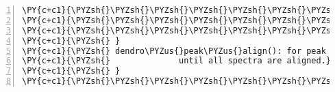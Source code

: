 \begin{Verbatim}[commandchars=\\\{\},codes={\catcode`\$=3\catcode`\^=7\catcode`\_=8},gobble=0,numbers=left,fontfamily=fvm,fontshape=n,fontsize=\footnotesize,tabsize=2]
\PY{c+c1}{\PYZsh{}\PYZsh{}\PYZsh{}\PYZsh{}\PYZsh{}\PYZsh{}\PYZsh{}\PYZsh{}\PYZsh{}\PYZsh{}\PYZsh{}\PYZsh{}\PYZsh{}\PYZsh{}\PYZsh{}\PYZsh{}\PYZsh{}\PYZsh{}\PYZsh{}\PYZsh{}\PYZsh{}\PYZsh{}\PYZsh{}\PYZsh{}\PYZsh{}\PYZsh{}\PYZsh{}\PYZsh{}\PYZsh{}\PYZsh{}\PYZsh{}\PYZsh{}\PYZsh{}\PYZsh{}\PYZsh{}\PYZsh{}\PYZsh{}\PYZsh{}\PYZsh{}\PYZsh{}\PYZsh{}\PYZsh{}\PYZsh{}\PYZsh{}\PYZsh{}\PYZsh{}\PYZsh{}\PYZsh{}\PYZsh{}\PYZsh{}\PYZsh{}\PYZsh{}\PYZsh{}\PYZsh{}\PYZsh{}\PYZsh{}\PYZsh{}\PYZsh{}\PYZsh{}\PYZsh{}\PYZsh{}\PYZsh{}\PYZsh{}\PYZsh{}\PYZsh{}\PYZsh{}\PYZsh{}\PYZsh{}\PYZsh{}\PYZsh{}\PYZsh{}\PYZsh{}\PYZsh{}\PYZsh{}\PYZsh{}\PYZsh{}\PYZsh{}\PYZsh{}\PYZsh{}}
\PY{c+c1}{\PYZsh{}\PYZsh{}\PYZsh{}\PYZsh{}\PYZsh{}\PYZsh{}\PYZsh{}\PYZsh{}\PYZsh{}\PYZsh{}\PYZsh{}\PYZsh{}\PYZsh{}\PYZsh{}\PYZsh{}\PYZsh{}\PYZsh{}\PYZsh{}\PYZsh{}\PYZsh{}\PYZsh{}\PYZsh{}\PYZsh{}\PYZsh{}\PYZsh{}\PYZsh{}\PYZsh{}\PYZsh{}\PYZsh{}\PYZsh{}\PYZsh{}\PYZsh{}\PYZsh{}\PYZsh{}\PYZsh{}\PYZsh{}\PYZsh{} Function \PYZsh{}\PYZsh{}\PYZsh{}\PYZsh{}\PYZsh{}\PYZsh{}\PYZsh{}\PYZsh{}\PYZsh{}\PYZsh{}\PYZsh{}\PYZsh{}\PYZsh{}\PYZsh{}\PYZsh{}\PYZsh{}\PYZsh{}\PYZsh{}\PYZsh{}\PYZsh{}\PYZsh{}\PYZsh{}\PYZsh{}\PYZsh{}\PYZsh{}\PYZsh{}\PYZsh{}\PYZsh{}\PYZsh{}\PYZsh{}\PYZsh{}\PYZsh{}}
\PY{c+c1}{\PYZsh{}\PYZsh{}\PYZsh{}\PYZsh{}\PYZsh{}\PYZsh{}\PYZsh{}\PYZsh{}\PYZsh{}\PYZsh{}\PYZsh{}\PYZsh{}\PYZsh{}\PYZsh{}\PYZsh{}\PYZsh{}\PYZsh{}\PYZsh{}\PYZsh{}\PYZsh{}\PYZsh{}\PYZsh{}\PYZsh{}\PYZsh{}\PYZsh{}\PYZsh{}\PYZsh{}\PYZsh{}\PYZsh{}\PYZsh{}\PYZsh{}\PYZsh{}\PYZsh{}\PYZsh{}\PYZsh{}\PYZsh{}\PYZsh{}\PYZsh{}\PYZsh{}\PYZsh{}\PYZsh{}\PYZsh{}\PYZsh{}\PYZsh{}\PYZsh{}\PYZsh{}\PYZsh{}\PYZsh{}\PYZsh{}\PYZsh{}\PYZsh{}\PYZsh{}\PYZsh{}\PYZsh{}\PYZsh{}\PYZsh{}\PYZsh{}\PYZsh{}\PYZsh{}\PYZsh{}\PYZsh{}\PYZsh{}\PYZsh{}\PYZsh{}\PYZsh{}\PYZsh{}\PYZsh{}\PYZsh{}\PYZsh{}\PYZsh{}\PYZsh{}\PYZsh{}\PYZsh{}\PYZsh{}\PYZsh{}\PYZsh{}\PYZsh{}\PYZsh{}\PYZsh{}}
\PY{c+c1}{\PYZsh{} }
\PY{c+c1}{\PYZsh{} dendro\PYZus{}peak\PYZus{}align(): for peak list data, create successive N\PYZhy{} and M\PYZhy{}alignments}
\PY{c+c1}{\PYZsh{}              until all spectra are aligned.}
\PY{c+c1}{\PYZsh{} }
\PY{c+c1}{\PYZsh{}\PYZsh{}\PYZsh{}\PYZsh{}\PYZsh{}\PYZsh{}\PYZsh{}\PYZsh{}\PYZsh{}\PYZsh{}\PYZsh{}\PYZsh{}\PYZsh{}\PYZsh{}\PYZsh{}\PYZsh{}\PYZsh{}\PYZsh{}\PYZsh{}\PYZsh{}\PYZsh{}\PYZsh{}\PYZsh{}\PYZsh{}\PYZsh{}\PYZsh{}\PYZsh{}\PYZsh{}\PYZsh{}\PYZsh{}\PYZsh{}\PYZsh{}\PYZsh{}\PYZsh{}\PYZsh{}\PYZsh{}\PYZsh{}\PYZsh{}\PYZsh{}\PYZsh{}\PYZsh{}\PYZsh{}\PYZsh{}\PYZsh{}\PYZsh{}\PYZsh{}\PYZsh{}\PYZsh{}\PYZsh{}\PYZsh{}\PYZsh{}\PYZsh{}\PYZsh{}\PYZsh{}\PYZsh{}\PYZsh{}\PYZsh{}\PYZsh{}\PYZsh{}\PYZsh{}\PYZsh{}\PYZsh{}\PYZsh{}\PYZsh{}\PYZsh{}\PYZsh{}\PYZsh{}\PYZsh{}\PYZsh{}\PYZsh{}\PYZsh{}\PYZsh{}\PYZsh{}\PYZsh{}\PYZsh{}\PYZsh{}\PYZsh{}\PYZsh{}\PYZsh{}}

\end{Verbatim}
